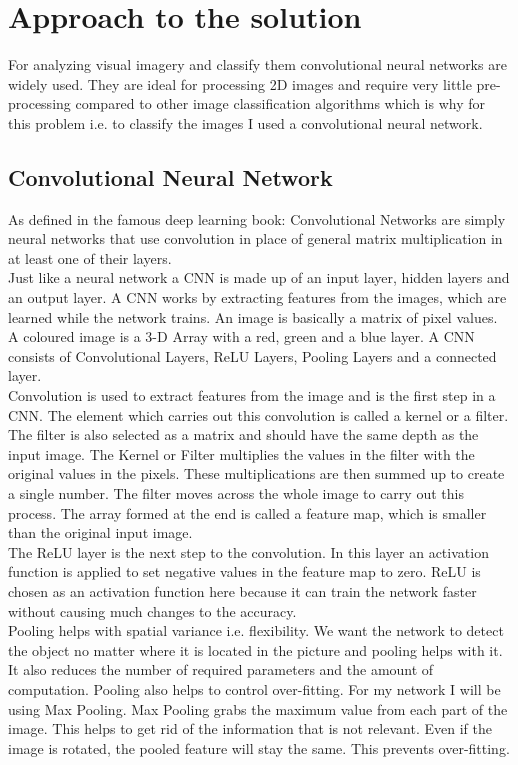 \documentclass[10pt,twocolumn,letterpaper]{article}
\begin{document}
\section{Approach to the solution}
For analyzing visual imagery and classify them convolutional neural networks are widely used. They are ideal for processing 2D images and require very little pre-processing compared to other image classification algorithms which is why for this problem i.e. to classify the images I used a convolutional neural network.

\subsection{Convolutional Neural Network}
As defined in the famous deep learning book: Convolutional Networks are simply neural networks that use convolution in place of general matrix multiplication in at least one of their layers. \cite{dlbook}\\
Just like a neural network a CNN is made up of an input layer, hidden layers and an output layer. A CNN works by extracting features from the images, which are learned while the network trains. An image is basically a matrix of pixel values. A coloured image is a 3-D Array with a red, green and a blue layer. A CNN consists of Convolutional Layers, ReLU Layers, Pooling Layers and a connected layer. \\
Convolution is used to extract features from the image and is the first step in a CNN. The element which carries out this convolution is called a kernel or a filter. The filter is also selected as a matrix and should have the same depth as the input image. The Kernel or Filter multiplies the values in the filter with the original values in the pixels. These multiplications are then summed up to create a single number. The filter moves across the whole image to carry out this process. The array formed at the end is called a feature map, which is smaller than the original input image.\\
The ReLU layer is the next step to the convolution. In this layer an activation function is applied to set negative values in the feature map to zero. ReLU is chosen as an activation function here because it can train the network faster without causing much changes to the accuracy. \\
Pooling helps with spatial variance i.e. flexibility. We want the network to detect the object no matter where it is located in the picture and pooling helps with it. It also reduces the number of required parameters and the amount of computation. Pooling also helps to control over-fitting. For my network I will be using Max Pooling. Max Pooling grabs the maximum value from each part of the image. This helps to get rid of the information that is not relevant. Even if the image is rotated, the pooled feature will stay the same. This prevents over-fitting. \\
\end{document}

